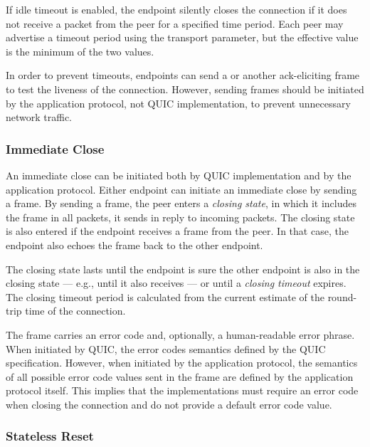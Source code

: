 If idle timeout is enabled, the endpoint silently closes the connection if it does not receive a
packet from the peer for a specified time period. Each peer may advertise a timeout period using the
\MaxIdleTimeout{} transport parameter, but the effective value is the minimum of the two values.

In order to prevent timeouts, endpoints can send a \PING{} or another ack-eliciting frame to test
the liveness of the connection. However, sending \PING{} frames should be initiated by the
application protocol, not QUIC implementation, to prevent unnecessary network traffic.

\subsubsection{Immediate Close}

An immediate close can be initiated both by QUIC implementation and by the application protocol.
Either endpoint can initiate an immediate close by sending a \CONNECTIONCLOSE{} frame. By sending a
\CONNECTIONCLOSE{} frame, the peer enters a \textit{closing state}, in which it includes the
\CONNECTIONCLOSE{} frame in all packets, it sends in reply to incoming packets. The closing state is
also entered if the endpoint receives a \CONNECTIONCLOSE{} frame from the peer. In that case, the
endpoint also echoes the \CONNECTIONCLOSE{} frame back to the other endpoint.

The closing state lasts until the endpoint is sure the other endpoint is also in the closing state
--- e.g., until it also receives \CONNECTIONCLOSE{} --- or until a \textit{closing timeout} expires.
The closing timeout period is calculated from the current estimate of the round-trip time of the
connection.

The \CONNECTIONCLOSE{} frame carries an error code and, optionally, a human-readable error phrase.
When initiated by QUIC, the error codes semantics defined by the QUIC specification. However, when
initiated by the application protocol, the semantics of all possible error code values sent in the
frame are defined by the application protocol itself. This implies that the implementations must
require an error code when closing the connection and do not provide a default error code value.

\subsubsection{Stateless Reset}\label{sec:02-stateless-reset}

